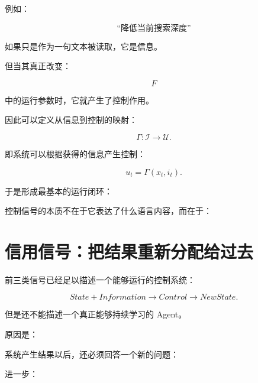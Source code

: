 例如：

\[
\text{“降低当前搜索深度”}
\]

如果只是作为一句文本被读取，它是信息。

但当其真正改变：

\[
F
\]

中的运行参数时，它就产生了控制作用。

因此可以定义从信息到控制的映射：

\[
\boxed{
\Gamma:
\mathcal I
\rightarrow
\mathcal U.
}
\]

即系统可以根据获得的信息产生控制：

\[
u_t
=
\Gamma(
x_t,
i_t
).
\]

于是形成最基本的运行闭环：

\begin{statementbox}
\centering
{}
\end{statementbox}

控制信号的本质不在于它表达了什么语言内容，而在于：

\begin{statementbox}
\centering
{}
\end{statementbox}

\section{信用信号：把结果重新分配给过去}

前三类信号已经足以描述一个能够运行的控制系统：

\[
State
+
Information
\rightarrow
Control
\rightarrow
NewState.
\]

但是还不能描述一个真正能够持续学习的 Agent。

原因是：

系统产生结果以后，还必须回答一个新的问题：

\begin{statementbox}
\centering
{}
\end{statementbox}

进一步：

\begin{statementbox}
\centering
{}
\end{statementbox}

